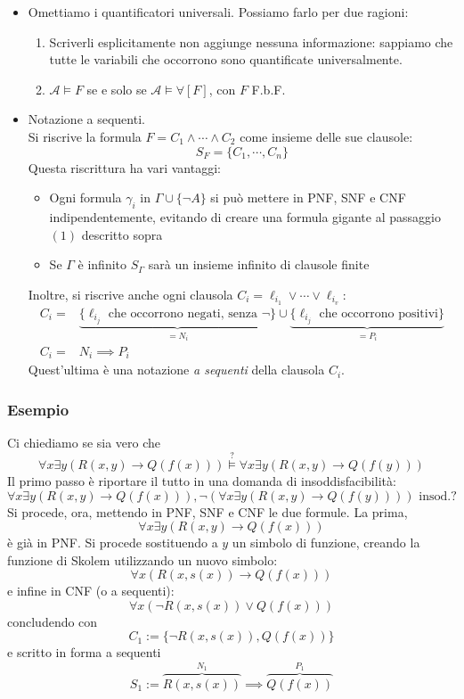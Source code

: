 \begin{itemize}
  \item Omettiamo i quantificatori universali. Possiamo farlo per due ragioni: 
    \begin{enumerate}
      \item Scriverli esplicitamente non aggiunge nessuna informazione: sappiamo che tutte le variabili che occorrono sono quantificate universalmente.
      \item $\mathscr{A} \models F$ se e solo se $\mathscr{A} \models \forall[F]$, con $F$ F.b.F.
    \end{enumerate}
  \item Notazione a sequenti. \\
    Si riscrive la formula $F = C_1 \land \cdots \land C_2$ come insieme delle sue clausole:
    $$
    S_F = \{C_1, \cdots, C_n\}
    $$
    Questa riscrittura ha vari vantaggi: 
    \begin{itemize}
      \item Ogni formula $\gamma_i$ in $\Gamma \cup \{\neg A\}$ si può mettere in PNF, SNF e CNF indipendentemente, evitando di creare una formula gigante al passaggio $(1)$ descritto sopra
      \item Se $\Gamma$ è infinito $S_{\Gamma}$ sarà un insieme infinito di clausole finite
    \end{itemize}
    Inoltre, si riscrive anche ogni clausola $C_i = \ell_{i_1} \lor \cdots \lor \ell_{i_v}$:
    \begin{align*}
    C_i = & \underbrace{\{\ell_{i_j} \text{ che occorrono negati, senza } \neg\}}_{= N_i} \cup \underbrace{\{\ell_{i_j} \text{ che occorrono positivi}\}}_{= P_i} \\
    C_i = & N_i \implies P_i
    \end{align*}
    Quest'ultima è una notazione \textit{a sequenti} della clausola $C_i$. 
\end{itemize}

\subsubsection{Esempio}
Ci chiediamo se sia vero che
$$
\forall x \exists y (R(x,y) \rightarrow Q(f(x))) \stackrel ? \models \forall x \exists y (R(x,y) \rightarrow Q(f(y)))
$$
Il primo passo è riportare il tutto in una domanda di insoddisfacibilità: 
$$
\forall x \exists y (R(x,y) \rightarrow Q(f(x))), \neg (\forall x \exists y (R(x,y) \rightarrow Q(f(y)))) \text{ insod.?}
$$
Si procede, ora, mettendo in PNF, SNF e CNF le due formule.
La prima, 
$$
\forall x \exists y (R(x,y) \rightarrow Q(f(x)))
$$
è già in PNF. Si procede sostituendo a $y$ un simbolo di funzione, creando la 
funzione di Skolem utilizzando un nuovo simbolo: 
$$
\forall x (R(x, s(x)) \rightarrow Q(f(x)))
$$
e infine in CNF (o a sequenti): 
$$
\forall x (\neg R(x, s(x)) \lor Q(f(x)))
$$
concludendo con 
$$
C_1 := \{\neg R(x,s(x)), Q(f(x))\}
$$
e scritto in forma a sequenti 
$$
S_1 := \overbrace{R(x, s(x))}^{N_1} \implies \overbrace{Q(f(x))}^{P_1}
$$

